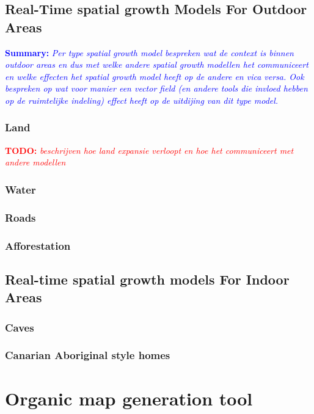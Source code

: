 \documentclass{article}
\newcommand{\todo}[1]{\textcolor{red}{\textbf{TODO: }\it{#1}}}
\newcommand{\inhoud}[1]{\textcolor{blue}{\textbf{Summary: }\it{#1}}}
\begin{document}
\cite{lcreport}


\subsection{Real-Time spatial growth Models For Outdoor Areas}
\inhoud{Per type spatial growth model bespreken wat de context is binnen outdoor areas en dus met 
welke andere spatial growth modellen het communiceert en welke effecten het spatial growth model heeft 
op de andere en vica versa. Ook bespreken op wat voor manier een vector field (en andere tools 
die invloed hebben op de ruimtelijke indeling)  effect heeft op de uitdijing van dit type model.   
}

\subsubsection{Land} 
\todo{beschrijven hoe land expansie verloopt en hoe het communiceert met andere modellen}


\subsubsection{Water} 

\subsubsection{Roads}

\subsubsection{Afforestation} 

\subsection{Real-time spatial growth models For Indoor Areas}

\subsubsection{Caves}

\subsubsection{Canarian Aboriginal style homes}

\section{Organic map generation tool}
\end{document}
